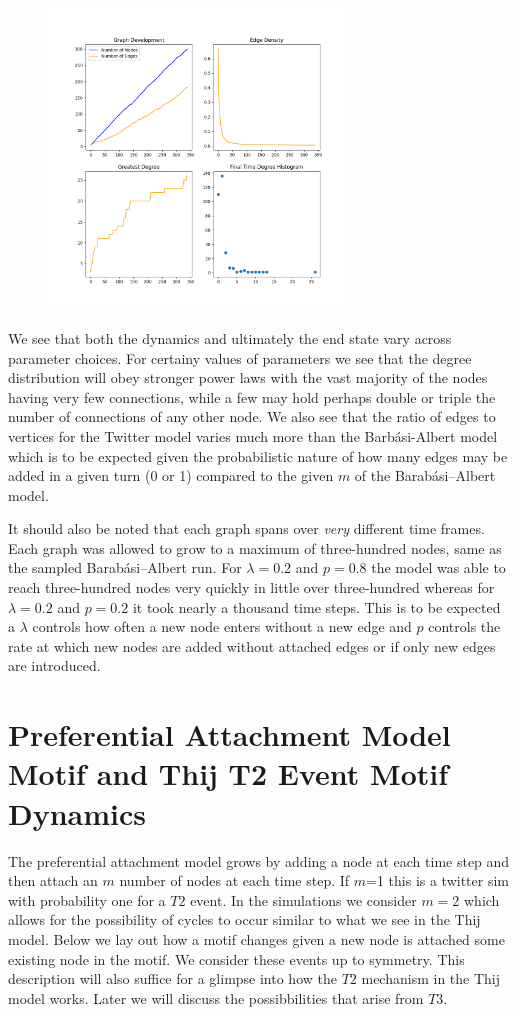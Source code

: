 \begin{figure}[h!]
    \includegraphics[width=8cm]{Images/twitter_sim_stats_3_0.8_0.8.png}
    \centering
\end{figure}

\FloatBarrier

We see that both the dynamics and ultimately the end state vary across parameter choices.
For certainy values of parameters we see that the degree distribution will obey stronger
power laws with the vast majority of the nodes having very few connections, while a few may hold
perhaps double or triple the number of connections of any other node. We also see that
the ratio of edges to vertices for the Twitter model varies much more than the Barbási-Albert model
which is to be expected given the probabilistic nature of how many edges may be added in a given turn (0 or 1) compared
to the given $m$ of the Barabási–Albert model.

\vspace{3mm}

It should also be noted that each graph spans over \textit{very} different
time frames. Each graph was allowed to grow to a maximum of three-hundred nodes, same as the
sampled Barabási–Albert run. For $\lambda=0.2$ and $p=0.8$ the model was able to reach 
three-hundred nodes very quickly in little over three-hundred whereas for $\lambda=0.2$ and $p=0.2$ it took nearly a thousand time
steps. This is to be expected a $\lambda$ controls how often a new node enters without a new edge and
$p$ controls the rate at which new nodes are added without attached edges or if only new edges are introduced. 

\chapter{Preferential Attachment Model Motif and Thij T2 Event Motif Dynamics}
The preferential attachment model grows by adding a node at each time step and then
attach an $m$ number of nodes at each time step. If $m$=1 this is a twitter sim
with probability one for a $T2$ event. In the simulations we consider $m=2$ which allows
for the possibility of cycles to occur similar to what we see in the Thij model. Below we 
lay out how a motif changes given a new node is attached some existing node in the motif. We 
consider these events up to symmetry. This description will also suffice for a glimpse into how the $T2$ mechanism in the Thij
model works. Later we will discuss the possibbilities that arise from $T3$.

